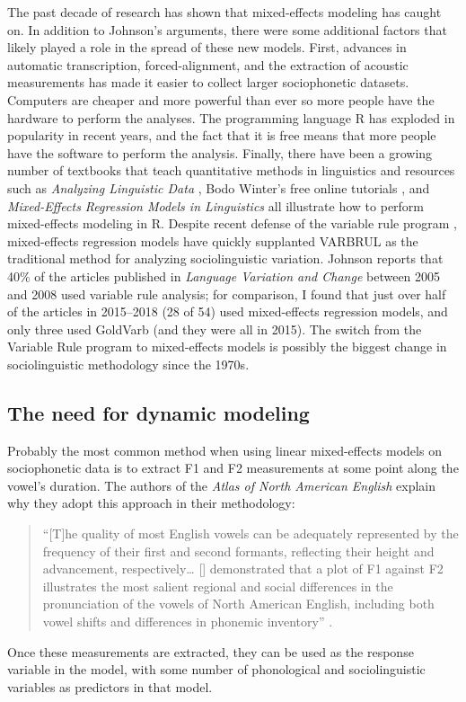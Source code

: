 The past decade of research has shown that mixed-effects modeling has caught on. In addition to Johnson's arguments, there were some additional factors that likely played a role in the spread of these new models. First, advances in automatic transcription, forced-alignment, and the extraction of acoustic measurements has made it easier to collect larger sociophonetic datasets. Computers are cheaper and more powerful than ever so more people have the hardware to perform the analyses. The programming language R \citep{r_2018} has exploded in popularity in recent years, and the fact that it is free means that more people have the software to perform the analysis. Finally, there have been a growing number of textbooks that teach quantitative methods in linguistics \citep{tagliamonte_2006, johnson_2008, macaulay_2009, gries_2009, gries_2010, levshina_2015, eddington_2015, grant_etal_2017, winter_2019} and resources such as \textit{Analyzing Linguistic Data} \citep{baayen_2008}, Bodo Winter's free online tutorials \citep{winter_2013}, and \textit{Mixed-Effects Regression Models in Linguistics} \citep{speelman_etal_2018} all illustrate how to perform mixed-effects modeling in R. Despite recent defense of the variable rule program \citep{tagliamonte_darcy_2017}, mixed-effects regression models have quickly supplanted VARBRUL as the traditional method for analyzing sociolinguistic variation. Johnson \citeyearpar[360]{johnson_2009} reports that 40\% of the articles published in \textit{Language Variation and Change} between 2005 and 2008 used variable rule analysis; for comparison, I found that just over half of the articles in 2015--2018 (28 of 54) used mixed-effects regression models, and only three used GoldVarb (and they were all in 2015). The switch from the Variable Rule program to mixed-effects models is possibly the biggest change in sociolinguistic methodology since the 1970s.

\subsection{The need for dynamic modeling}
\label{dynamic_modeling}

Probably the most common method when using linear mixed-effects models on sociophonetic data is to extract F1 and F2 measurements at some point along the vowel's duration. The authors of the \textit{Atlas of North American English} explain why they adopt this approach in their methodology:
\begin{quote}
    ``[T]he quality of most English vowels can be adequately represented by the frequency of their first and second formants, reflecting their height and advancement, respectively… [\citet{labov_1972_LYS}] demonstrated that a plot of F1 against F2 illustrates the most salient regional and social differences in the pronunciation of the vowels of North American English, including both vowel shifts and differences in phonemic inventory'' \citep[37]{labov_ash_boberg_2006_anae}.
\end{quote}
Once these measurements are extracted, they can be used as the response variable in the model, with some number of phonological and sociolinguistic variables as predictors in that model.

